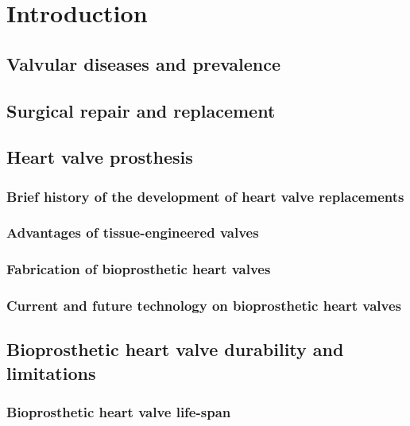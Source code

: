\chapter{Introduction} %

\section{Valvular diseases and prevalence}


\section{Surgical repair and replacement}


\section{Heart valve prosthesis}

\subsection{Brief history of the development of heart valve replacements}

\subsection{Advantages of tissue-engineered valves}

\subsection{Fabrication of bioprosthetic heart valves}

\subsection{Current and future technology on bioprosthetic heart valves}


\section{Bioprosthetic heart valve durability and limitations}

\subsection{Bioprosthetic heart valve life-span}

